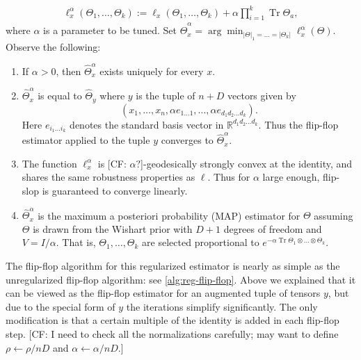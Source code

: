 \documentclass[aos]{imsart}
\theoremstyle{definition}
\numberwithin{equation}{section}
\DeclareMathOperator{\tr}{Tr}
\newcommand{\R}{{\mathbb{R}}}
\newcommand{\ot}{\otimes}
\newcommand{\samp}{x}
\newcommand{\CF}[1]{{\color{purple}[CF: #1]}}
\begin{document}
\begin{align*}
  \ell_{\samp}^\alpha(\Theta_1, \dots, \Theta_k)
  := \ell_{\samp}(\Theta_1, \dots, \Theta_k) + \alpha \prod_{i=1}^k \tr \Theta_a,
\end{align*}
where $\alpha$ is a parameter to be tuned. Set $\widehat{\Theta}^\alpha_x = \arg\min_{|\Theta|_1 =\dots =  |\Theta_k|} \ell^\alpha_\samp(\Theta)$.
Observe the following:
\begin{enumerate}
\item If $\alpha > 0$, then $\widehat{\Theta}^\alpha_x$ exists uniquely for every $x$.
\item $\widehat{\Theta}^\alpha_x$ is equal to $\widehat{\Theta}_{y}$ where $y$ is the tuple of $n + D$ vectors given by
$$(x_1, \dots, x_n, \alpha e_{1\dots 1}, \dots, \alpha e_{d_1d_2 \dots d_k}).$$ Here $e_{i_1 \dots i_k}$ denotes the standard basis vector in $\R^{d_1d_2 \dots d_k}$. Thus the flip-flop estimator applied to the tuple $y$ converges to $\widehat{\Theta}^\alpha_x$.
\item The function $\ell^\alpha_\samp$ is \CF{$\alpha?$}-geodesically strongly convex at the identity, and shares the same robustness properties as $\ell$. Thus for $\alpha$ large enough, flip-slop is guaranteed to converge linearly.
\item $\widehat{\Theta}^\alpha_\samp$ is the maximum a posteriori probability (MAP) estimator for $\Theta$ assuming $\Theta$ is drawn from the Wishart prior with $D + 1$ degrees of freedom and $V = I/\alpha$. That is, $\Theta_1, \dots, \Theta_k$ are selected proportional to $e^{- \alpha \tr \Theta_1 \ot \dots \ot \Theta_k}.$
\end{enumerate}


The flip-flop algorithm for this regularized estimator is nearly as simple as the unregularized flip-flop algorithm: see \cref{alg:reg-flip-flop}. Above we explained that it can be viewed as the flip-flop estimator for an augmented tuple of tensors $y$, but due to the special form of $y$ the iterations simplify significantly. The only modification is that a certain multiple of the identity is added in each flip-flop step.  \CF{I need to check all the normalizations carefully; may want to define $\rho \leftarrow \rho/nD$ and $\alpha \leftarrow \alpha/nD$.}
\end{document}
